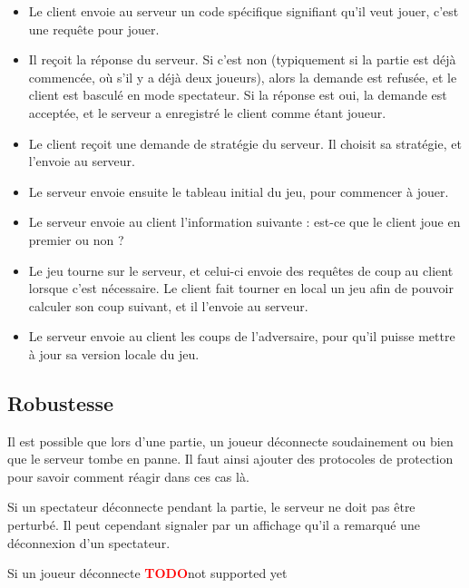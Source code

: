 \documentclass[a4paper]{article}
\newcommand{\TODO}{\textcolor{red}{\textbf{TODO}}}
\begin{document}
%
\begin{itemize}
	\setlength\itemsep{1em}
	\item Le client envoie au serveur un code spécifique signifiant qu'il veut jouer, c'est une requête pour jouer.
	\item Il reçoit la réponse du serveur. Si c'est non (typiquement si la partie est déjà commencée, où s'il y a déjà deux joueurs), alors la demande est refusée, et le client est basculé en mode spectateur. Si la réponse est oui, la demande est acceptée, et le serveur a enregistré le client comme étant joueur.
	\item Le client reçoit une demande de stratégie du serveur. Il choisit sa stratégie, et l'envoie au serveur.
	\item Le serveur envoie ensuite le tableau initial du jeu, pour commencer à jouer.
	\item Le serveur envoie au client l'information suivante : est-ce que le client joue en premier ou non ?
	\item Le jeu tourne sur le serveur, et celui-ci envoie des requêtes de coup au client lorsque c'est nécessaire. Le client fait tourner en local un jeu afin de pouvoir calculer son coup suivant, et il l'envoie au serveur.
	\item Le serveur envoie au client les coups de l'adversaire, pour qu'il puisse mettre à jour sa version locale du jeu.
\end{itemize}
%


\subsection{Robustesse}

Il est possible que lors d'une partie, un joueur déconnecte soudainement ou 
bien que le serveur tombe en panne. Il faut ainsi ajouter des protocoles de 
protection pour savoir comment réagir dans ces cas là.

Si un spectateur déconnecte pendant la partie, le serveur ne doit pas être 
perturbé. Il peut cependant signaler par un affichage qu'il a remarqué une 
déconnexion d'un spectateur.

Si un joueur déconnecte \TODO not supported yet
\end{document}
